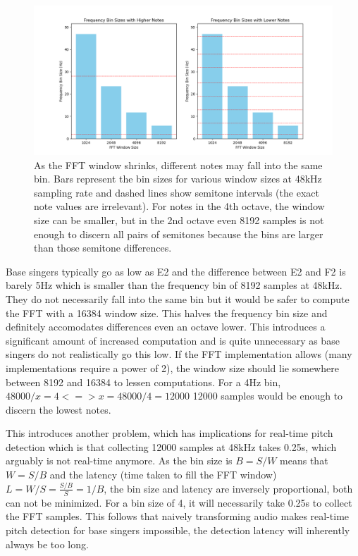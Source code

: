 \begin{figure}[ht]
    \centering
    \includegraphics[width=\textwidth]{./images/fft_bin_size_chart.png}
    \caption{As the FFT window shrinks, different notes may fall into the same bin. Bars represent the bin sizes for various window sizes at 48kHz sampling rate and dashed lines show semitone intervals (the exact note values are irrelevant). For notes in the 4th octave, the window size can be smaller, but in the 2nd octave even 8192 samples is not enough to discern all pairs of semitones because the bins are larger than those semitone differences.\label{fig:fftBinSizeChart}}
\end{figure}

Base singers typically go as low as E2 and the difference between E2 and F2 is barely 5Hz which is smaller than the frequency bin of 8192 samples at 48kHz. They do not necessarily fall into the same bin but it would be safer to compute the FFT with a 16384 window size. This halves the frequency bin size and definitely accomodates differences even an octave lower. This introduces a significant amount of increased computation and is quite unnecessary as base singers do not realistically go this low. If the FFT implementation allows (many implementations require a power of 2), the window size should lie somewhere between 8192 and 16384 to lessen computations. For a 4Hz bin, $48000/x = 4 <=> x = 48000/4 = 12000$ 12000 samples would be enough to discern the lowest notes. 

This introduces another problem, which has implications for real-time pitch detection which is that collecting 12000 samples at 48kHz takes 0.25s, which arguably is not real-time anymore. As the bin size is $B = S/W$ means that $W = S/B$ and the latency (time taken to fill the FFT window) $L = W/S = \frac{S/B}{S} = 1/B$, the bin size and latency are inversely proportional, both can not be minimized. For a bin size of 4, it will necessarily take 0.25s to collect the FFT samples. This follows that naively transforming audio makes real-time pitch detection for base singers impossible, the detection latency will inherently always be too long.

